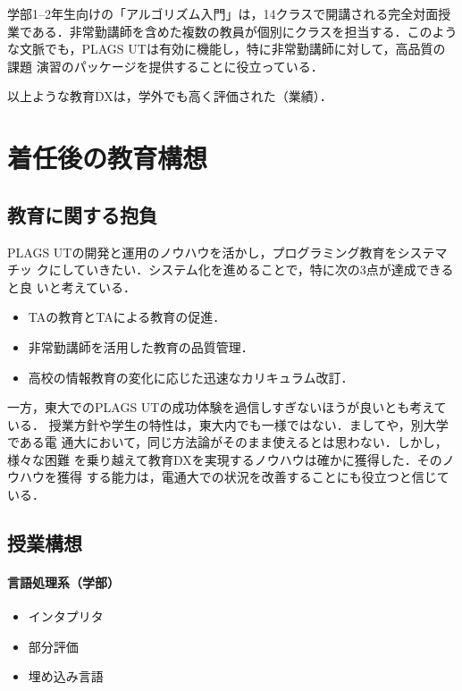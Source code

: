 \documentclass[dvipdfmx]{jsarticle}
\begin{document}
学部1--2年生向けの「アルゴリズム入門」は，14クラスで開講される完全対面授
業である．非常勤講師を含めた複数の教員が個別にクラスを担当する．このよう
な文脈でも，PLAGS UTは有効に機能し，特に非常勤講師に対して，高品質の課題
演習のパッケージを提供することに役立っている．

以上ような教育DXは，学外でも高く評価された（業績\cite{axies22:plags}）．

\section*{着任後の教育構想}

\subsection*{教育に関する抱負}

PLAGS UTの開発と運用のノウハウを活かし，プログラミング教育をシステマチッ
クにしていきたい．システム化を進めることで，特に次の3点が達成できると良
いと考えている．
\begin{itemize}
 \item TAの教育とTAによる教育の促進．

 \item 非常勤講師を活用した教育の品質管理．

 \item 高校の情報教育の変化に応じた迅速なカリキュラム改訂．
\end{itemize}

一方，東大でのPLAGS UTの成功体験を過信しすぎないほうが良いとも考えている．
授業方針や学生の特性は，東大内でも一様ではない．ましてや，別大学である電
通大において，同じ方法論がそのまま使えるとは思わない．しかし，様々な困難
を乗り越えて教育DXを実現するノウハウは確かに獲得した．そのノウハウを獲得
する能力は，電通大での状況を改善することにも役立つと信じている．

\subsection*{授業構想}

\paragraph{言語処理系（学部）}
\begin{itemize}
 \item インタプリタ
 \item 部分評価
 \item 埋め込み言語
\end{itemize}
\end{document}
